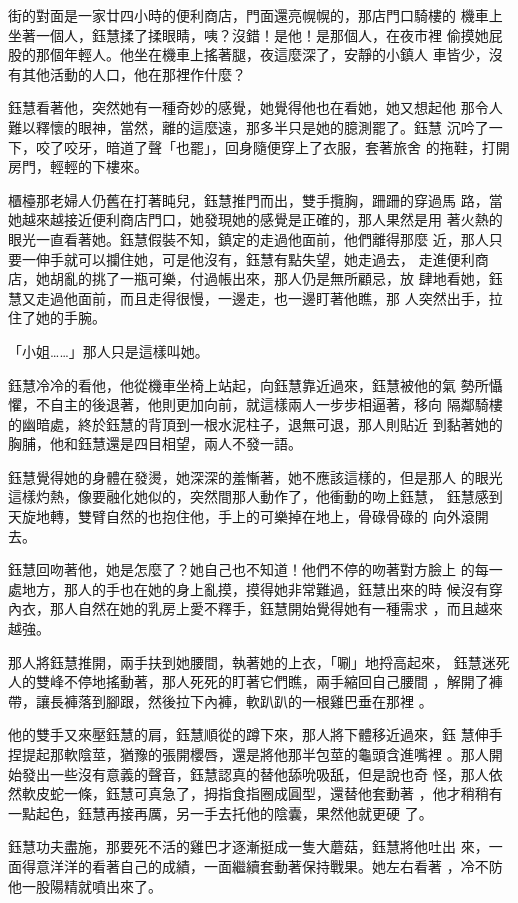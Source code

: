 街的對面是一家廿四小時的便利商店，門面還亮幌幌的，那店門口騎樓的
機車上坐著一個人，鈺慧揉了揉眼睛，咦？沒錯！是他！是那個人，在夜市裡
偷摸她屁股的那個年輕人。他坐在機車上搖著腿，夜這麼深了，安靜的小鎮人
車皆少，沒有其他活動的人口，他在那裡作什麼？

鈺慧看著他，突然她有一種奇妙的感覺，她覺得他也在看她，她又想起他
那令人難以釋懷的眼神，當然，離的這麼遠，那多半只是她的臆測罷了。鈺慧
沉吟了一下，咬了咬牙，暗道了聲「也罷」，回身隨便穿上了衣服，套著旅舍
的拖鞋，打開房門，輕輕的下樓來。

櫃檯那老婦人仍舊在打著盹兒，鈺慧推門而出，雙手攬胸，跚跚的穿過馬
路，當她越來越接近便利商店門口，她發現她的感覺是正確的，那人果然是用
著火熱的眼光一直看著她。鈺慧假裝不知，鎮定的走過他面前，他們離得那麼
近，那人只要一伸手就可以攔住她，可是他沒有，鈺慧有點失望，她走過去，
走進便利商店，她胡亂的挑了一瓶可樂，付過帳出來，那人仍是無所顧忌，放
肆地看她，鈺慧又走過他面前，而且走得很慢，一邊走，也一邊盯著他瞧，那
人突然出手，拉住了她的手腕。

「小姐……」那人只是這樣叫她。

鈺慧冷冷的看他，他從機車坐椅上站起，向鈺慧靠近過來，鈺慧被他的氣
勢所懾懼，不自主的後退著，他則更加向前，就這樣兩人一步步相逼著，移向
隔鄰騎樓的幽暗處，終於鈺慧的背頂到一根水泥柱子，退無可退，那人則貼近
到黏著她的胸脯，他和鈺慧還是四目相望，兩人不發一語。

鈺慧覺得她的身體在發燙，她深深的羞慚著，她不應該這樣的，但是那人
的眼光這樣灼熱，像要融化她似的，突然間那人動作了，他衝動的吻上鈺慧，
鈺慧感到天旋地轉，雙臂自然的也抱住他，手上的可樂掉在地上，骨碌骨碌的
向外滾開去。

鈺慧回吻著他，她是怎麼了？她自己也不知道！他們不停的吻著對方臉上
的每一處地方，那人的手也在她的身上亂摸，摸得她非常難過，鈺慧出來的時
候沒有穿內衣，那人自然在她的乳房上愛不釋手，鈺慧開始覺得她有一種需求
，而且越來越強。

那人將鈺慧推開，兩手扶到她腰間，執著她的上衣，「唰」地捋高起來，
鈺慧迷死人的雙峰不停地搖動著，那人死死的盯著它們瞧，兩手縮回自己腰間
，解開了褲帶，讓長褲落到腳跟，然後拉下內褲，軟趴趴的一根雞巴垂在那裡
。

他的雙手又來壓鈺慧的肩，鈺慧順從的蹲下來，那人將下體移近過來，鈺
慧伸手捏提起那軟陰莖，猶豫的張開櫻唇，還是將他那半包莖的龜頭含進嘴裡
。那人開始發出一些沒有意義的聲音，鈺慧認真的替他舔吮吸舐，但是說也奇
怪，那人依然軟皮蛇一條，鈺慧可真急了，拇指食指圈成圓型，還替他套動著
，他才稍稍有一點起色，鈺慧再接再厲，另一手去托他的陰囊，果然他就更硬
了。

鈺慧功夫盡施，那要死不活的雞巴才逐漸挺成一隻大蘑菇，鈺慧將他吐出
來，一面得意洋洋的看著自己的成績，一面繼續套動著保持戰果。她左右看著
，冷不防他一股陽精就噴出來了。

